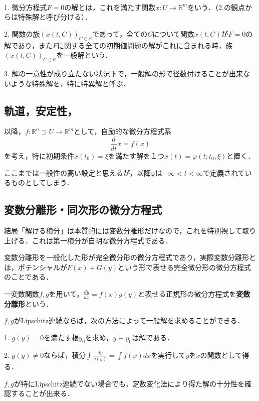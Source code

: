 \documentclass[uplatex,dvipdfmx]{jsreport}
\begin{document}
\begin{definition}[微分方程式の解]　

    1. 微分方程式$F=0$の解とは，これを満たす関数$x:U\to\mathbb{R}^m$をいう．（2.の観点からは特殊解と呼び分ける）．

    2. 関数の族$(x(t,C))_{C\in\mathbb{R}}$であって，全ての$C$について関数$x(t,C)$が$F=0$の解であり，また$F$に関する全ての初期値問題の解がこれに含まれる時，族$(x(t,C))_{C\in\mathbb{R}}$を一般解という．

    3. 解の一意性が成り立たない状況下で，一般解の形で径数付けることが出来ないような特殊解を，特に特異解と呼ぶ．
\end{definition}

\subsection{軌道，安定性，}

\begin{shadebox}
    以降，$f:\mathbb{R}^n\supset U\to \mathbb{R}^m$として，自励的な微分方程式系
    \[ \frac{d}{dt}x=f(x) \]
    を考え，特に初期条件$x(t_0)=\xi$を満たす解を１つ$x(t)=\varphi(t;t_0,\xi)$と置く．
    
    ここまでは一般性の高い設定と思えるが，以降$\varphi$は$-\infty<t<\infty$で定義されているものとしてしまう．
\end{shadebox}

\subsection{変数分離形・同次形の微分方程式}
結局「解ける積分」は本質的には変数分離形だけなので，これを特別視して取り上げる．これは第一積分が自明な微分方程式である．

変数分離形を一般化した形が完全微分形の微分方程式であり，実際変数分離形とは，ポテンシャルが$F(x)+G(y)$という形で表せる完全微分形の微分方程式のことである．

\begin{proposition}[変数分離形の方程式の解法]
    一変数関数$f,g$を用いて，$\frac{dy}{dx}=f(x)g(y)$と表せる正規形の微分方程式を\textbf{変数分離形}という．

    $f,g$がLipschitz連続ならば，次の方法によって一般解を求めることができる．

    1. $g(y)=0$を満たす根$y_0$を求め，$y\equiv y_0$は解である．

    2. $g(y)\ne 0$ならば，積分$\int\frac{dy}{g(y)}=\int f(x)dx$を実行して$y$を$x$の関数として得る．

    $f,g$が特にLipschitz連続でない場合でも，定数変化法により得た解の十分性を確認することが出来る．
\end{proposition}
\end{document}
